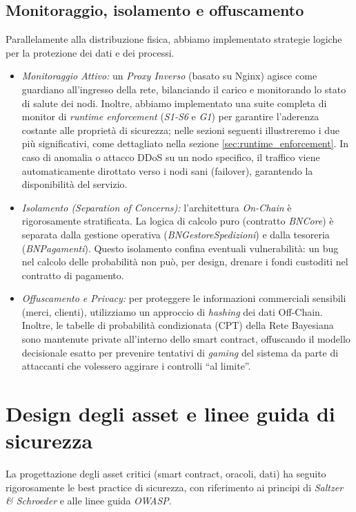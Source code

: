 \subsection{Monitoraggio, isolamento e offuscamento}
Parallelamente alla distribuzione fisica, abbiamo implementato strategie logiche per la protezione dei dati e dei processi.
\begin{itemize}
    \item \textit{Monitoraggio Attivo:} un \textit{Proxy Inverso} (basato su Nginx) agisce come guardiano all'ingresso della rete, bilanciando il carico e monitorando lo stato di salute dei nodi. Inoltre, abbiamo implementato una suite completa di monitor di \textit{runtime enforcement} (\textit{S1-S6} e \textit{G1}) per garantire l'aderenza costante alle proprietà di sicurezza; nelle sezioni seguenti illustreremo i due più significativi, come dettagliato nella sezione \ref{sec:runtime_enforcement}. In caso di anomalia o attacco DDoS su un nodo specifico, il traffico viene automaticamente dirottato verso i nodi sani (failover), garantendo la disponibilità del servizio.
    \item \textit{Isolamento (Separation of Concerns):} l'architettura \textit{On-Chain} è rigorosamente stratificata. La logica di calcolo puro (contratto \textit{BNCore}) è separata dalla gestione operativa (\textit{BNGestoreSpedizioni}) e dalla tesoreria (\textit{BNPagamenti}). Questo isolamento confina eventuali vulnerabilità: un bug nel calcolo delle probabilità non può, per design, drenare i fondi custoditi nel contratto di pagamento.
    \item \textit{Offuscamento e Privacy:} per proteggere le informazioni commerciali sensibili (merci, clienti), utilizziamo un approccio di \textit{hashing} dei dati Off-Chain. Inoltre, le tabelle di probabilità condizionata (CPT) della Rete Bayesiana sono mantenute private all'interno dello smart contract, offuscando il modello decisionale esatto per prevenire tentativi di \textit{gaming} del sistema da parte di attaccanti che volessero aggirare i controlli ``al limite''.
\end{itemize}

\section{Design degli asset e linee guida di sicurezza}

La progettazione degli asset critici (smart contract, oracoli, dati) ha seguito rigorosamente le best practice di sicurezza, con riferimento ai principi di \textit{Saltzer \& Schroeder} e alle linee guida \textit{OWASP}.

